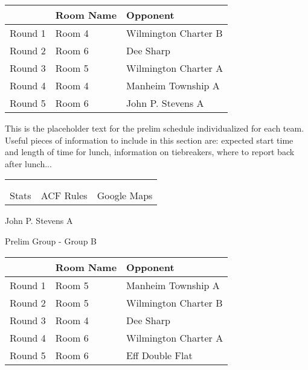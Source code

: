 \documentclass{article}%
\begin{document}
\vspace*{4pt}%
\begin{tabularx}{\textwidth}{|c|Y|Y|}%
\hline%
&Room Name&Opponent\\%
\hline%
Round 1&Room 4&Wilmington Charter B\\%
Round 2&Room 6&Dee Sharp\\%
Round 3&Room 5&Wilmington Charter A\\%
Round 4&Room 4&Manheim Township A\\%
Round 5&Room 6&John P. Stevens A\\%
\hline%
\end{tabularx}%
\vspace*{30pt}%
\linebreak%
This is the placeholder text for the prelim schedule individualized for each team. Useful pieces of information to include in this section are: expected start time and length of time for lunch, information on tiebreakers, where to report back after lunch...%
\vspace*{30pt}%
\newline%
%
\begin{tabularx}{\textwidth}{YYY}%
  &  &  \\%
\\%
Stats&ACF Rules&Google Maps\\%
\end{tabularx}%
\newpage%
%
\begin{center}%
\begin{Huge}%
John P. Stevens A%
\end{Huge}%
\vspace*{12pt}%
\linebreak%
\begin{Large}%
Prelim Group {-} Group B%
\end{Large}%
\end{center}%
\vspace*{4pt}%
\begin{tabularx}{\textwidth}{|c|Y|Y|}%
\hline%
&Room Name&Opponent\\%
\hline%
Round 1&Room 5&Manheim Township A\\%
Round 2&Room 5&Wilmington Charter B\\%
Round 3&Room 4&Dee Sharp\\%
Round 4&Room 6&Wilmington Charter A\\%
Round 5&Room 6&Eff Double Flat\\%
\hline%
\end{tabularx}%
\end{document}
